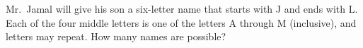 Mr.\ Jamal will give his son a six-letter name that starts with J and ends with L. Each of the four middle letters is one of the letters A through M (inclusive), and letters may repeat. How many names are possible?
